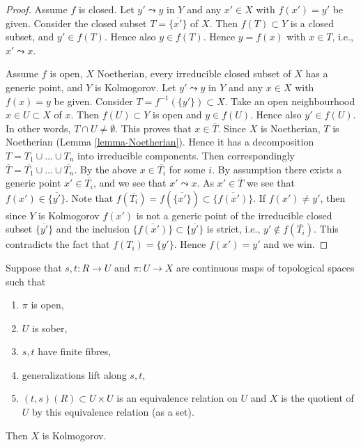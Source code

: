 \begin{proof}
Assume $f$ is closed. Let $y' \leadsto y$ in $Y$ and any $x'\in X$ with
$f(x') = y'$ be given. Consider the closed subset $T = \overline{\{x'\}}$
of $X$. Then $f(T) \subset Y$ is a closed subset, and $y' \in f(T)$.
Hence also $y \in f(T)$. Hence $y = f(x)$ with $x \in T$, i.e.,
$x' \leadsto x$.

\medskip\noindent
Assume $f$ is open, $X$ Noetherian, every irreducible closed subset of $X$
has a generic point, and $Y$ is Kolmogorov.
Let $y' \leadsto y$ in $Y$ and any $x \in X$ with
$f(x) = y$ be given. Consider $T = f^{-1}(\{y'\}) \subset X$.
Take an open neighbourhood $x \in U \subset X$ of $x$.
Then $f(U) \subset Y$ is open and $y \in f(U)$. Hence also $y' \in f(U)$.
In other words, $T \cap U \not = \emptyset$. This proves that
$x \in \overline{T}$. Since $X$ is Noetherian, $T$ is Noetherian
(Lemma \ref{lemma-Noetherian}).
Hence it has a decomposition $T = T_1 \cup \ldots \cup T_n$ into irreducible
components. Then correspondingly
$\overline{T} = \overline{T_1} \cup \ldots \cup \overline{T_n}$.
By the above $x \in \overline{T_i}$ for some $i$. By assumption
there exists a generic point $x' \in \overline{T_i}$, and
we see that $x' \leadsto x$. As $x' \in \overline{T}$ we see that
$f(x') \in \overline{\{y'\}}$. Note that
$f(\overline{T_i}) = f(\overline{\{x'\}}) \subset \overline{\{f(x')\}}$.
If $f(x') \not = y'$, then since $Y$ is Kolmogorov $f(x')$ is not a generic
point of the irreducible closed subset $\overline{\{y'\}}$ and the inclusion
$\overline{\{f(x')\}} \subset \overline{\{y'\}}$
is strict, i.e., $y' \not \in f(\overline{T_i})$.
This contradicts the fact that $f(T_i) = \{y'\}$.
Hence $f(x') = y'$ and we win.
\end{proof}

\begin{lemma}
\label{lemma-quotient-kolmogorov}
Suppose that $s, t : R \to U$ and $\pi : U \to X$ are continuous maps
of topological spaces such that
\begin{enumerate}
\item $\pi$ is open,
\item $U$ is sober,
\item $s, t$ have finite fibres,
\item generalizations lift along $s, t$,
\item $(t, s)(R) \subset U \times U$ is an equivalence relation on $U$ and
$X$ is the quotient of $U$ by this equivalence relation (as a set).
\end{enumerate}
Then $X$ is Kolmogorov.
\end{lemma}

